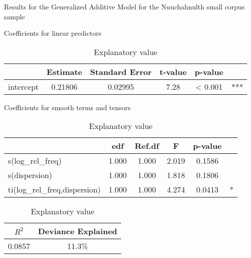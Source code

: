 \begin{table}[h!]

  \caption{Results for the Generalized Additive Model for the Nuuchahnulth small corpus sample}
  \label{tab:GAM-Nuu-small}

  \begin{subtable}[h]{\textwidth}
    \centering
    \caption{Coefficients for linear predictors}
    \begin{tabular}{ l c c c c c }
      {       } & Estimate & Standard Error & t-value & p-value & { }\\
      \midrule
      intercept & 0.21806  & 0.02995        & 7.28    & < 0.001 & ***\\
    \end{tabular}
  \end{subtable}

  \vspace{1em}

  \begin{subtable}[h]{\textwidth}
    \centering
    \caption{Coefficients for smooth terms and tensors}
    \begin{tabular}{ l c c c c c }
      { }                           & edf   & Ref.df & F     & p-value & { }\\
      \midrule
      s(log\_rel\_freq)             & 1.000 & 1.000  & 2.019 & 0.1586  & { } \\
      s(dispersion)                 & 1.000 & 1.000  & 1.818 & 0.1806  & { } \\
      ti(log\_rel\_freq,dispersion) & 1.000 & 1.000  & 4.274 & 0.0413  & *\\
    \end{tabular}
  \end{subtable}

  \vspace{1em}

  \begin{subtable}[h]{\textwidth}
    \centering
    \caption{Explanatory value}
    \begin{tabular}{ c c }
      $R^2$  & Deviance Explained\\
      \midrule
      0.0857 & 11.3\%\\
    \end{tabular}
  \end{subtable}

\end{table}

